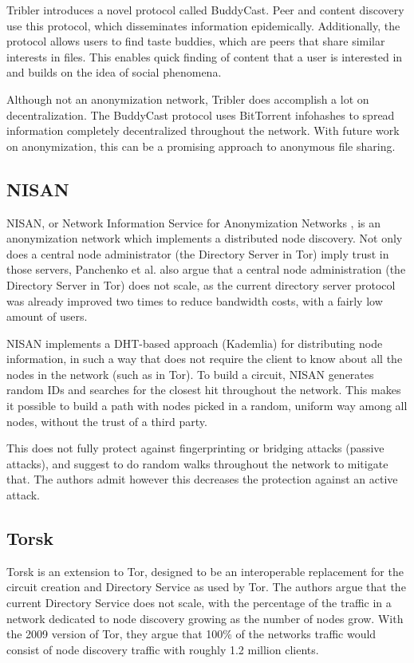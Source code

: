 \documentclass{article}
\begin{document}
		Tribler introduces a novel protocol called BuddyCast. Peer and content discovery use this protocol, which disseminates information epidemically. Additionally, the protocol allows users to find taste buddies, which are peers that share similar interests in files. This enables quick finding of content that a user is interested in and builds on the idea of social phenomena.
		
		Although not an anonymization network, Tribler does accomplish a lot on decentralization. The BuddyCast protocol uses BitTorrent infohashes to spread information completely decentralized throughout the network. With future work on anonymization, this can be a promising approach to anonymous file sharing.

	\subsection{NISAN} %
		NISAN, or Network Information Service for Anonymization Networks \cite{panchenko2006nisan}, is an anonymization network which implements a distributed node discovery. Not only does a central node administrator (the Directory Server in Tor) imply trust in those servers, Panchenko et al. also argue that a central node administration (the Directory Server in Tor) does not scale, as the current directory server protocol was already improved two times to reduce bandwidth costs, with a fairly low amount of users.
		
		NISAN implements a DHT-based approach (Kademlia) for distributing node information, in such a way that does not require the client to know about all the nodes in the network (such as in Tor). To build a circuit, NISAN generates random IDs and searches for the closest hit throughout the network. This makes it possible to build a path with nodes picked in a random, uniform way among all nodes, without the trust of a third party.
		
		This does not fully protect against fingerprinting or bridging attacks (passive attacks), and suggest to do random walks throughout the network to mitigate that. The authors admit however this decreases the protection against an active attack.
		
	\subsection{Torsk} %
		Torsk \cite{mclachlan2009scalable} is an extension to Tor, designed to be an interoperable replacement for the circuit creation and Directory Service as used by Tor. The authors argue that the current Directory Service does not scale, with the percentage of the traffic in a network dedicated to node discovery growing as the number of nodes grow. With the 2009 version of Tor, they argue that 100\% of the networks traffic would consist of node discovery traffic with roughly 1.2 million clients. 
		
\end{document}
